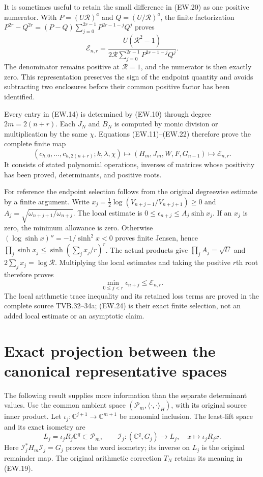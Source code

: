 \documentclass[11pt]{article}
\newcommand{\C}{\mathbb C}
\begin{document}
It is sometimes useful to retain the small difference in (EW.20)
as one positive numerator. With
$P=(U\mathscr R)^a$ and $Q=(U/\mathscr R)^a$, the finite
factorization $P^{2r}-Q^{2r}=(P-Q)\sum_{j=0}^{2r-1}P^{2r-1-j}Q^j$
proves
\[
 \boxed{\mathcal E_{n,r}=
 \frac{U(\mathscr R^2-1)}
 {2\mathscr R\displaystyle\sum_{j=0}^{2r-1}P^{2r-1-j}Q^j}.}
                                                               \tag{EW.22}
\]
The denominator remains positive at $\mathscr R=1$, and the
numerator is then exactly zero. This representation preserves the
sign of the endpoint quantity and avoids subtracting two enclosures
before their common positive factor has been identified.

Every entry in (EW.14) is determined by (EW.10) through degree
$2m=2(n+r)$. Each $J_N$ and $B_N$ is computed by monic division
or multiplication by the same $\chi$. Equations (EW.11)--(EW.22)
therefore prove the complete finite map
\[
 \boxed{(c_{h,0},\ldots,c_{h,2(n+r)};k,\lambda,\chi)
    \longmapsto(H_m,J_m,W,F,G_{n-1})
    \longmapsto\mathcal E_{n,r}.}                            \tag{EW.23}
\]
It consists of stated polynomial operations, inverses of matrices
whose positivity has been proved, determinants, and positive roots.

For reference the endpoint selection follows from the original
degreewise estimate by a finite argument. Write
$x_j=\tfrac12\log(V_{n+j-1}/V_{n+j+1})\ge0$ and
$A_j=\sqrt{\omega_{n+j+1}/\omega_{n+j}}$.
The local estimate is $0\le\epsilon_{n+j}\le A_j\sinh x_j$.
If an $x_j$ is zero, the minimum allowance is zero. Otherwise
$(\log\sinh x)''=-1/\sinh^2x<0$ proves finite Jensen, hence
$\prod_j\sinh x_j\le\sinh(\sum_jx_j/r)^r$.
The actual products give
$\prod_jA_j=\sqrt U$ and $2\sum_jx_j=\log\mathscr R$.
Multiplying the local estimates and taking the positive $r$th root
therefore proves
\[
 \min_{0\le j<r}\epsilon_{n+j}\le\mathcal E_{n,r}.           \tag{EW.24}
\]
The local arithmetic trace inequality and its retained loss terms are
proved in the complete source TVB.32--34a; (EW.24) is their exact
finite selection, not an added local estimate or an asymptotic claim.

\section{Exact projection between the canonical representative spaces}

The following result supplies more information than the separate
determinant values. Use the common ambient space
$(\mathcal P_m,\langle\cdot,\cdot\rangle_H)$, with its original
source inner product. Let $\iota_j:\C^{j+1}\to\C^{m+1}$ be
monomial inclusion. The least-lift space and its exact isometry are
\[
 L_j=\iota_jR_j\C^q\subset\mathcal P_m,\qquad
 \mathscr I_j:(\C^q,G_j)\longrightarrow L_j,\quad x\longmapsto\iota_jR_jx.
                                                               \tag{EW.25}
\]
Here $\mathscr I_j^*H_m\mathscr I_j=G_j$ proves the word isometry;
its inverse on $L_j$ is the original remainder map. The original
arithmetic correction $T_N$ retains its meaning in (EW.19).
\end{document}
